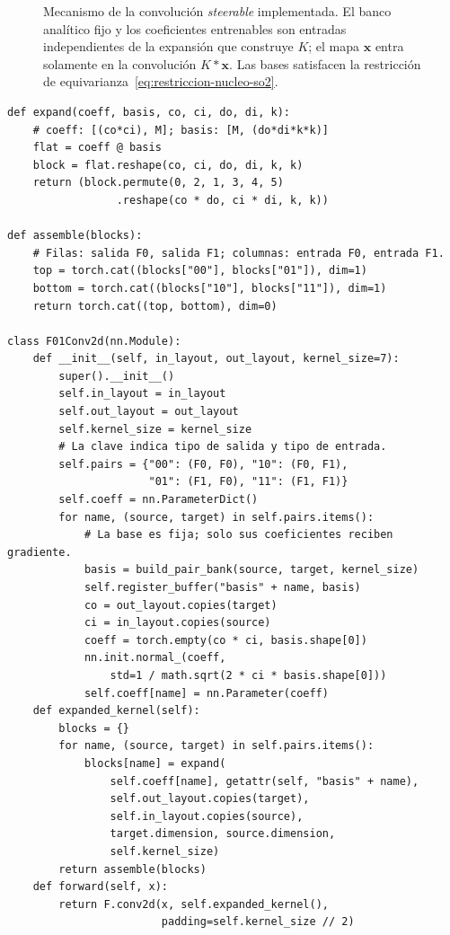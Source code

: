 \begin{figure}[htbp]
    \centering
    \resizebox{\textwidth}{!}{}
    \caption[Flujo de la convolución \emph{steerable} implementada.]{Mecanismo de
    la convolución \emph{steerable} implementada. El banco
    analítico fijo y los coeficientes entrenables son entradas independientes
    de la expansión que construye \(K\); el mapa \(\mathbf{x}\) entra solamente
    en la convolución \(K*\mathbf{x}\). Las bases satisfacen la restricción de
    equivarianza~\eqref{eq:restriccion-nucleo-so2}.}
    \label{fig:convolucion-so2-implementacion}
\end{figure}

\begingroup{}
\begin{lstlisting}[float=p,basicstyle=\ttfamily\fontsize{9}{10.5}\selectfont,caption={Módulo simplificado, en estilo PyTorch, de una convolución entre capas mixtas de campos \(F_0\) y \(F_1\).},label={lst:convolucion-so2}]
def expand(coeff, basis, co, ci, do, di, k):
    # coeff: [(co*ci), M]; basis: [M, (do*di*k*k)]
    flat = coeff @ basis
    block = flat.reshape(co, ci, do, di, k, k)
    return (block.permute(0, 2, 1, 3, 4, 5)
                 .reshape(co * do, ci * di, k, k))

def assemble(blocks):
    # Filas: salida F0, salida F1; columnas: entrada F0, entrada F1.
    top = torch.cat((blocks["00"], blocks["01"]), dim=1)
    bottom = torch.cat((blocks["10"], blocks["11"]), dim=1)
    return torch.cat((top, bottom), dim=0)

class F01Conv2d(nn.Module):
    def __init__(self, in_layout, out_layout, kernel_size=7):
        super().__init__()
        self.in_layout = in_layout
        self.out_layout = out_layout
        self.kernel_size = kernel_size
        # La clave indica tipo de salida y tipo de entrada.
        self.pairs = {"00": (F0, F0), "10": (F0, F1),
                      "01": (F1, F0), "11": (F1, F1)}
        self.coeff = nn.ParameterDict()
        for name, (source, target) in self.pairs.items():
            # La base es fija; solo sus coeficientes reciben gradiente.
            basis = build_pair_bank(source, target, kernel_size)
            self.register_buffer("basis" + name, basis)
            co = out_layout.copies(target)
            ci = in_layout.copies(source)
            coeff = torch.empty(co * ci, basis.shape[0])
            nn.init.normal_(coeff,
                std=1 / math.sqrt(2 * ci * basis.shape[0]))
            self.coeff[name] = nn.Parameter(coeff)
    def expanded_kernel(self):
        blocks = {}
        for name, (source, target) in self.pairs.items():
            blocks[name] = expand(
                self.coeff[name], getattr(self, "basis" + name),
                self.out_layout.copies(target),
                self.in_layout.copies(source),
                target.dimension, source.dimension,
                self.kernel_size)
        return assemble(blocks)
    def forward(self, x):
        return F.conv2d(x, self.expanded_kernel(),
                        padding=self.kernel_size // 2)
\end{lstlisting}
\endgroup

